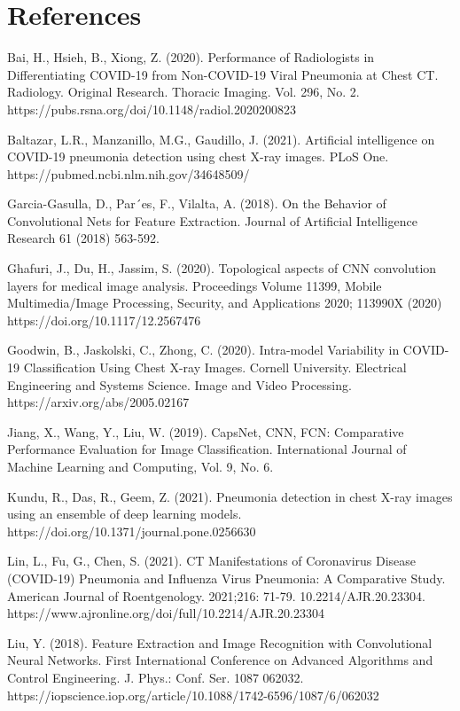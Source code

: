 \documentclass[12pt, twocolumn]{CUP-JNL-PPS}
\begin{document}
\section{References}
\medskip
\noindent
[1]     Bai, H., Hsieh, B., Xiong, Z. (2020). Performance of Radiologists in Differentiating COVID-19 from Non-COVID-19 Viral Pneumonia at Chest
CT. Radiology. Original Research. Thoracic Imaging. Vol. 296, No. 2.
https://pubs.rsna.org/doi/10.1148/radiol.2020200823

\medskip
\noindent
[2]     Baltazar, L.R., Manzanillo, M.G., Gaudillo, J. (2021). Artificial intelligence
on COVID-19 pneumonia detection using chest X-ray images. PLoS One.
https://pubmed.ncbi.nlm.nih.gov/34648509/

\medskip
\noindent
[3]     Garcia-Gasulla, D., Par´es, F., Vilalta, A. (2018). On the Behavior of Convolutional Nets for Feature Extraction. Journal of Artificial Intelligence Research 61 (2018) 563-592.

\medskip
\noindent
[4]     Ghafuri, J., Du, H., Jassim, S. (2020). Topological aspects of CNN convolution layers for medical image analysis. Proceedings Volume 11399, Mobile
Multimedia/Image Processing, Security, and Applications 2020; 113990X
(2020) https://doi.org/10.1117/12.2567476

\medskip
\noindent
[5]     Goodwin, B., Jaskolski, C., Zhong, C. (2020). Intra-model Variability in
COVID-19 Classification Using Chest X-ray Images. Cornell University. Electrical Engineering and Systems Science. Image and Video Processing.
https://arxiv.org/abs/2005.02167

\medskip
\noindent
[6]     Jiang, X., Wang, Y., Liu, W. (2019). CapsNet, CNN, FCN: Comparative
Performance Evaluation for Image Classification. International Journal of
Machine Learning and Computing, Vol. 9, No. 6.

\medskip
\noindent
[7]     Kundu, R., Das, R., Geem, Z. (2021). Pneumonia detection in
chest X-ray images using an ensemble of deep learning models.
https://doi.org/10.1371/journal.pone.0256630

\medskip
\noindent
[8]     Lin, L., Fu, G., Chen, S. (2021). CT Manifestations of
Coronavirus Disease (COVID-19) Pneumonia and Influenza
Virus Pneumonia: A Comparative Study. American Journal
of Roentgenology. 2021;216: 71-79. 10.2214/AJR.20.23304.
https://www.ajronline.org/doi/full/10.2214/AJR.20.23304

\medskip
\noindent
[9]     Liu, Y. (2018). Feature Extraction and Image Recognition with Convolutional Neural Networks. First International Conference on Advanced Algorithms and Control Engineering. J. Phys.: Conf. Ser. 1087 062032.
https://iopscience.iop.org/article/10.1088/1742-6596/1087/6/062032
\end{document}
